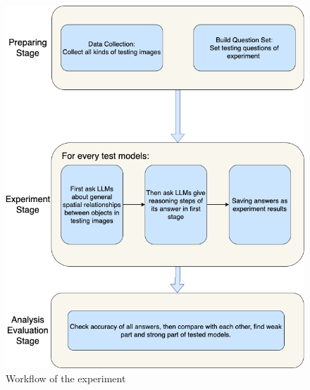 \documentclass[twocolumn,11pt]{report}
\begin{document}
\begin{figure}[htbp]
    \centering
    \includegraphics[width=0.8\linewidth]{./pic/workflow.drawio.png}
    \caption{Workflow of the experiment}
    \label{fig:workflow}
\end{figure}
\end{document}
